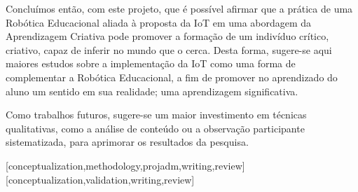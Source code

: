 \documentclass[portuguese]{textolivre}
\begin{document}
Concluímos então, com este projeto, que é possível afirmar que a prática de uma Robótica Educacional aliada à proposta da IoT em uma abordagem da Aprendizagem Criativa pode promover a formação de um indivíduo crítico, criativo, capaz de inferir no mundo que o cerca. Desta forma, sugere-se aqui maiores estudos sobre a implementação da IoT como uma forma de complementar a Robótica Educacional, a fim de promover no aprendizado do aluno um sentido em sua realidade; uma aprendizagem significativa. 

Como trabalhos futuros, sugere-se um maior investimento em técnicas qualitativas, como a análise de conteúdo ou a observação participante sistematizada, para aprimorar os resultados da pesquisa.

\printbibliography\label{sec-bib}

\begin{contributors}
[conceptualization,methodology,projadm,writing,review]
[conceptualization,validation,writing,review]
\end{contributors}
\end{document}
